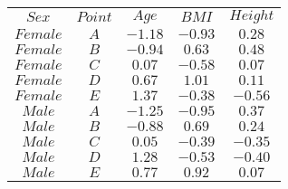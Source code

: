 \begin{tabular}{ccccc}
$Sex$ & $Point$ & $Age$ & $BMI$ & $Height$\\
$Female$ & $A$ & $-1.18$ & $-0.93$ & $0.28$\\
$Female$ & $B$ & $-0.94$ & $0.63$ & $0.48$\\
$Female$ & $C$ & $0.07$ & $-0.58$ & $0.07$\\
$Female$ & $D$ & $0.67$ & $1.01$ & $0.11$\\
$Female$ & $E$ & $1.37$ & $-0.38$ & $-0.56$\\
$Male$ & $A$ & $-1.25$ & $-0.95$ & $0.37$\\
$Male$ & $B$ & $-0.88$ & $0.69$ & $0.24$\\
$Male$ & $C$ & $0.05$ & $-0.39$ & $-0.35$\\
$Male$ & $D$ & $1.28$ & $-0.53$ & $-0.40$\\
$Male$ & $E$ & $0.77$ & $0.92$ & $0.07$\\
\end{tabular}
